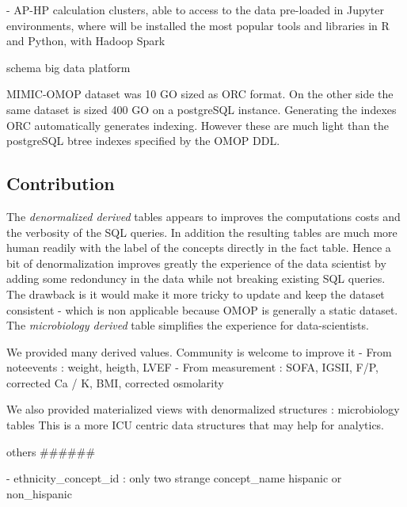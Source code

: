 - AP-HP calculation clusters, able to access to the data pre-loaded in Jupyter environments, where will be installed the most popular tools and libraries in R and Python, with Hadoop Spark

schema big data platform

MIMIC-OMOP dataset was 10 GO sized as ORC format. On the other side the same
dataset is sized 400 GO on a postgreSQL instance. Generating the indexes
ORC automatically generates indexing. However these are much light than the
postgreSQL btree indexes specified by the OMOP DDL.

\subsection{Contribution}

The \emph{denormalized derived} tables appears to improves the computations
costs and the verbosity of the SQL queries. In addition the resulting tables
are much more human readily with the label of the concepts directly in the fact
table. Hence a bit of denormalization improves greatly the experience of the
data scientist by adding some redonduncy in the data while not breaking
existing SQL queries. The drawback is it would make it more tricky to update
and keep the dataset consistent - which is non applicable because OMOP is
generally a static dataset.
The \emph{microbiology derived} table simplifies the experience for
data-scientists.

We provided many derived values. Community is welcome to improve it
- From noteevents : weight, heigth, LVEF
- From measurement : SOFA, IGSII, F/P, corrected Ca / K, BMI, corrected osmolarity

We also provided materialized views with denormalized structures : microbiology tables
This is a more ICU centric data structures that may help for analytics.

others
######

- ethnicity_concept_id : only two strange concept_name hispanic or non_hispanic
